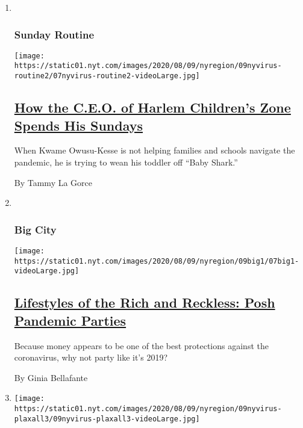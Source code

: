 \begin{enumerate}
\def\labelenumi{\arabic{enumi}.}
\item ~
  \hypertarget{sunday-routine}{%
  \subsubsection{Sunday Routine}\label{sunday-routine}}

  \texttt{[image: https://static01.nyt.com/images/2020/08/09/nyregion/09nyvirus-routine2/07nyvirus-routine2-videoLarge.jpg]}

  \hypertarget{how-the-ceo-of-harlem-childrens-zone-spends-his-sundays}{%
  \subsection{\texorpdfstring{\href{/2020/08/07/nyregion/Kwame-Owusu-Kesse.html}{How
  the C.E.O. of Harlem Children's Zone Spends His
  Sundays}}{How the C.E.O. of Harlem Children's Zone Spends His Sundays}}\label{how-the-ceo-of-harlem-childrens-zone-spends-his-sundays}}

  When Kwame Owusu-Kesse is not helping families and schools navigate
  the pandemic, he is trying to wean his toddler off ``Baby Shark.''

  By Tammy La Gorce
\item ~
  \hypertarget{big-city}{%
  \subsubsection{Big City}\label{big-city}}

  \texttt{[image: https://static01.nyt.com/images/2020/08/09/nyregion/09big1/07big1-videoLarge.jpg]}

  \hypertarget{lifestyles-of-the-rich-and-reckless-posh-pandemic-parties}{%
  \subsection{\texorpdfstring{\href{/2020/08/07/nyregion/coronavirus-rich-parties.html}{Lifestyles
  of the Rich and Reckless: Posh Pandemic
  Parties}}{Lifestyles of the Rich and Reckless: Posh Pandemic Parties}}\label{lifestyles-of-the-rich-and-reckless-posh-pandemic-parties}}

  Because money appears to be one of the best protections against the
  coronavirus, why not party like it's 2019?

  By Ginia Bellafante
\item
  \texttt{[image: https://static01.nyt.com/images/2020/08/09/nyregion/09nyvirus-plaxall3/09nyvirus-plaxall3-videoLarge.jpg]}


\end{enumerate}
